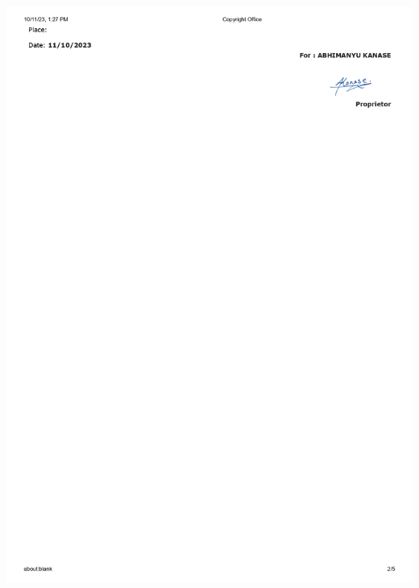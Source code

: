 \documentclass[12pt,a4paper]{report}
\begin{document}
\includegraphics[scale=0.7]
{images/copyright/Form14_page-0002.jpg}
\newpage
\end{document}

